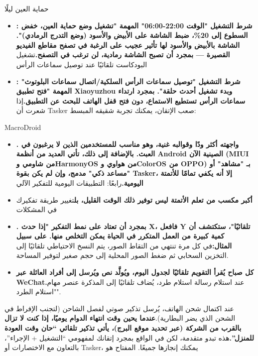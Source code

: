 
حماية العين ليلًا

\begin{itemize}
  \item \textbf{: شرط التشغيل "الوقت 22:00-06:00" المهمة "تشغيل وضع حماية العين، خفض السطوع إلى 20\%، ضبط الشاشة على الأبيض والأسود (وضع التدرج الرمادي)". الشاشة بالأبيض والأسود لها تأثير عجيب على الرغبة في تصفح مقاطع الفيديو القصيرة — بمجرد أن تصبح الشاشة رمادية، لن ترغب في التصفح.}تشغيل البودكاست تلقائيًا عند توصيل سماعات الرأس
  \item \textbf{: شرط التشغيل "توصيل سماعات الرأس السلكية/اتصال سماعات البلوتوث" المهمة "فتح تطبيق Xiaoyuzhou وبدء تشغيل أحدث حلقة". بمجرد ارتداء سماعات الرأس تستطيع الاستماع، دون فتح قفل الهاتف للبحث عن التطبيق.}إذا شعرت أن Tasker صعب الإتقان، يمكنك تجربة شقيقه المبسط:
\end{itemize}

MacroDroid

\begin{itemize}
  \item \textbf{. واجهته أكثر ودًا وقوالبه غنية، وهو مناسب للمستخدمين الذين لا يرغبون في العبث. بالإضافة إلى ذلك، تأتي العديد من أنظمة Android الصينية الآن (MIUI من شاومي وHarmonyOS من هواوي وColorOS من OPPO) بـ "مشاهد" أو "مساعد ذكي" مدمج، وإن لم يكن بقوة Tasker، إلا أنه يكفي تمامًا للأتمتة اليومية.}رابعًا: التطبيقات اليومية للتفكير الآلي
  \item \textbf{أكبر مكسب من تعلم الأتمتة ليس توفير ذلك الوقت القليل، بل}تغيير طريقة تفكيرك في المشكلات
  \item \textbf{. بمجرد أن تعتاد على نمط التفكير "إذا حدث X، فافعل Y تلقائيًا"، ستكتشف أن كمية كبيرة من العمل المتكرر في الحياة يمكن التخلص منها. على سبيل المثال:}في كل مرة تنتهي من التقاط الصور، يتم النسخ الاحتياطي تلقائيًا إلى التخزين السحابي ثم ضغط الصور المحلية إلى حجم صغير لتوفير المساحة.
  \item \textbf{كل صباح يُقرأ التقويم تلقائيًا لجدول اليوم، ويُولَّد نص ويُرسل إلى أفراد العائلة عبر WeChat.}عند استلام رسالة استلام طرد، يُضاف تلقائيًا إلى المذكرة عنصر مهام "استلام الطرد".
\end{itemize}

عند اكتمال شحن الهاتف، يُرسل تذكير صوتي لفصل الشاحن (لتجنب الإفراط في الشحن الذي يضر البطارية).\textbf{عندما يحين وقت انتهاء الدوام يوميًا، إذا كنت لا تزال بالقرب من الشركة (عبر تحديد موقع البرج)، يأتي تذكير تلقائي “حان وقت العودة للمنزل”.}هذه تبدو متقدمة، لكن في الواقع بمجرد إتقانك لمفهومي “التشغيل + الإجراء”، بالتعاون مع الاختصارات أو Tasker، يمكنك إنجازها جميعًا. المفتاح هو

